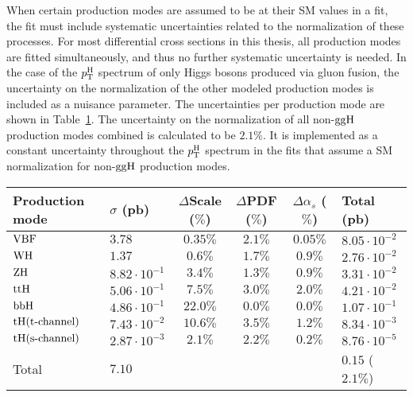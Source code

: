 When certain production modes are assumed to be at their SM values in a fit, the fit must include systematic uncertainties related to the normalization of these processes.
% 
For most differential cross sections in this thesis, all production modes are fitted simultaneously, and thus no further systematic uncertainty is needed.
% 
In the case of the $p_\mathrm{T}^\mathrm{H}$ spectrum of only Higgs bosons produced via gluon fusion, the uncertainty on the normalization of the other modeled production modes is included as a nuisance parameter.
% 
The uncertainties per production mode are shown in Table~\ref{tab:xhunc}.
% 
The uncertainty on the normalization of all non-$\mathrm{g}\mathrm{g}\mathrm{H}$ production modes combined is calculated to be $2.1\%$.
% 
It is implemented as a constant uncertainty throughout the $p_\mathrm{T}^\mathrm{H}$ spectrum in the fits that assume a SM normalization for non-$\mathrm{g}\mathrm{g}\mathrm{H}$ production modes.


\begin{table}[h!]
\centering
{}
\label{tab:xhunc}
\begin{tabular}{llcccl}
Production mode  &  $\sigma$ (pb)  &  $\Delta$Scale ($\%$)  &  $\Delta$PDF ($\%$)  &  $\Delta\alpha_s$ ($\%$)  &  Total (pb) \\
\hline
$\text{VBF}$                               & $3.78$                & $0.35\%$     & $2.1\%$      & $0.05\%$            & $8.05 \cdot 10^{-2}$ \\
$\mathrm{W}\mathrm{H}$                     & $1.37$                & $0.6\%$      & $1.7\%$      & $0.9\%$             & $2.76 \cdot 10^{-2}$ \\
$\mathrm{Z}\mathrm{H}$                     & $8.82 \cdot 10^{-1}$  & $3.4\%$      & $1.3\%$      & $0.9\%$             & $3.31 \cdot 10^{-2}$ \\
$\mathrm{t}\mathrm{t}\mathrm{H}$                               & $5.06 \cdot 10^{-1}$  & $7.5\%$      & $3.0\%$      & $2.0\%$             & $4.21 \cdot 10^{-2}$ \\
$\mathrm{b}\mathrm{b}\mathrm{H}$                               & $4.86 \cdot 10^{-1}$  & $22.0\%$     & $0.0\%$      & $0.0\%$             & $1.07 \cdot 10^{-1}$ \\
$\mathrm{t}\mathrm{H} (\text{t-channel})$  & $7.43 \cdot 10^{-2}$  & $10.6\%$     & $3.5\%$      & $1.2\%$             & $8.34 \cdot 10^{-3}$ \\
$\mathrm{t}\mathrm{H} (\text{s-channel})$  & $2.87 \cdot 10^{-3}$  & $2.1\%$      & $2.2\%$      & $0.2\%$             & $8.76 \cdot 10^{-5}$ \\
\hline
Total                                & $7.10$                &              &              &                     & $0.15$ ($2.1\%$) \\
\end{tabular}
\end{table}


